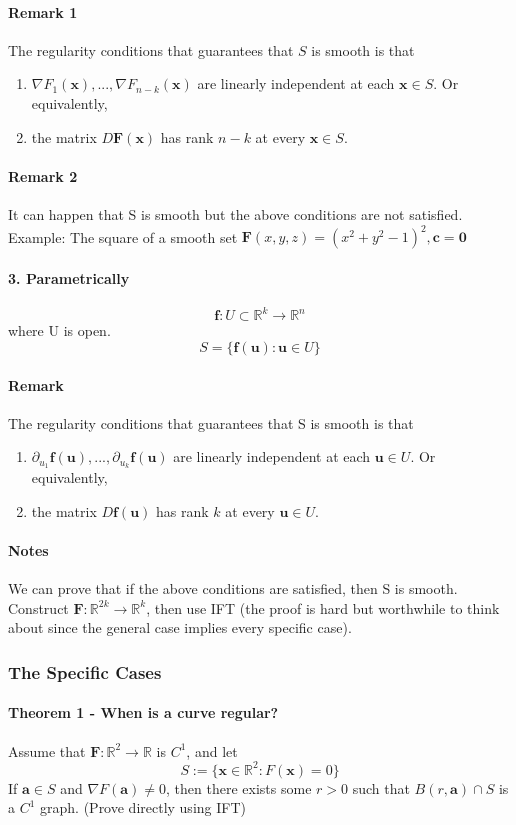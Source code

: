 \documentclass[11pt]{article}
\newcommand{\tb}[1]{\textbf{#1}}
\newcommand{\real}[0]{\mathbb{R}}
\newcommand{\func}[3]{\tb{#1}: {#2} \rightarrow {#3} }
\newcommand{\vo}[0]{\tb{0}}
\newcommand{\vc}[0]{\tb{c}}
\newcommand{\vf}[0]{\tb{F}}
\begin{document}
\paragraph{Remark 1} The regularity conditions that guarantees that $S$ is smooth is that
\begin{enumerate}
    \item $\nabla F_1(\tb{x}), ..., \nabla F_{n-k}(\tb{x})$ are linearly independent at each $\tb{x} \in S$. Or equivalently,
    \item the matrix $D\tb{F}(\tb{x})$ has rank $n-k$ at every $\tb{x} \in S$.
\end{enumerate}
\paragraph{Remark 2} It can happen that S is smooth but the above conditions are not satisfied. Example: The square of a smooth set $\vf(x,y,z) = (x^2 + y^2 - 1)^2,  \vc = \vo$
\paragraph{3. Parametrically}
$$\func{f}{U \subset \real^k}{\real^{n}}$$ where U is open.
$$ S = \{\tb{f}(\tb{u}): \tb{u} \in U\}$$
\paragraph{Remark} The regularity conditions that guarantees that S is smooth is that
\begin{enumerate}
    \item $\partial_{u_1}\tb{f}(\tb{u}),...,\partial_{u_k}\tb{f}(\tb{u})$ are linearly independent at each $\tb{u} \in U$. Or equivalently,
    \item the matrix $D\tb{f}(\tb{u})$ has rank $k$ at every $\tb{u} \in U$.
\end{enumerate}
\paragraph{Notes} We can prove that if the above conditions are satisfied, then S is smooth. Construct $\func{F}{\real^{2k}}{\real^k}$, then use IFT (the proof is hard but worthwhile to think about since the general case implies every specific case).

\subsubsection{The Specific Cases}
\paragraph{Theorem 1 - When is a curve regular?}
Assume that $\func{F}{\real^2}{\real}$ is $C^1$, and let
$$S:=\{\tb{x} \in \real^2: F(\tb{x}) = 0 \}$$
If $\tb{a} \in S$ and $\nabla F(\tb{a}) \neq 0$, then there exists some $r>0$ such that $B(r, \tb{a}) \cap S$ is a $C^1$ graph. \newline
(Prove directly using IFT)
\end{document}
